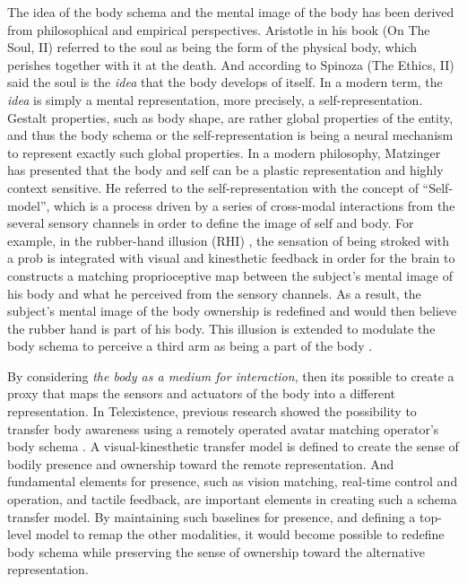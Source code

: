 The idea of the body schema and the mental image of the body has been derived from philosophical and empirical perspectives. Aristotle in his book (On The Soul, II) referred to the soul as being the form of the physical body, which perishes together with it at the death. And according to Spinoza (The Ethics, II) said the soul is the \textit{idea} that the body develops of itself. In a modern term, the \textit{idea} is simply a mental representation, more precisely, a self-representation. Gestalt properties, such as body shape, are rather global properties of the entity, and thus the body schema or the self-representation is being a neural mechanism to represent exactly such global properties. In a modern philosophy, Matzinger \cite{metzinger2007empirical} has presented that the body and self can be a plastic representation and highly context sensitive. He referred to the self-representation with the concept of ``Self-model'', which is a process driven by a series of cross-modal interactions from the several sensory channels in order to define the image of self and body. For example, in the rubber-hand illusion (RHI) \cite{botvinick1998rubber}, the sensation of being stroked with a prob is integrated with visual and kinesthetic feedback in order for the brain to constructs a matching proprioceptive map between the subject's mental image of his body and what he perceived from the sensory channels. As a result, the subject's mental image of the body ownership is redefined and would then believe the rubber hand is part of his body. This illusion is extended to modulate the body schema to perceive a third arm as being a part of the body \cite{guterstam2011illusion}.

By considering \textit{the body as a medium for interaction}, then its possible to create a proxy that maps the sensors and actuators of the body into a different representation. In Telexistence, previous research showed the possibility to transfer body awareness using a remotely operated avatar matching operator's body schema \cite{fernando2013design}. A visual-kinesthetic transfer model is defined to create the sense of bodily presence and ownership toward the remote representation. And fundamental elements for presence, such as vision matching, real-time control and operation, and tactile feedback, are important elements in creating such a schema transfer model. By maintaining such baselines for presence, and defining a top-level model to remap the other modalities, it would become possible to redefine body schema while preserving the sense of ownership toward the alternative representation.


